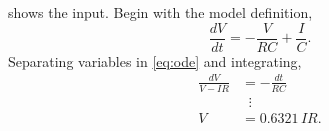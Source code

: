 \documentclass[11pt]{article}
\begin{document}
\begin{question}


 shows the input. Begin with the model definition,
\begin{equation}\label{eq:ode}
	\frac{dV}{dt} = -\frac{V}{RC} + \frac{I}{C}.
\end{equation}
Separating variables in \cref{eq:ode} and integrating,
\begin{align*}
	\frac{dV}{V - IR} &= -\frac{dt}{RC}\\
	&\;\;\vdots\\
	V &= 0.6321\,IR.
\end{align*}

\end{question}

\end{document}

